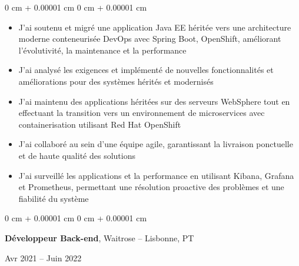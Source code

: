 \documentclass[10pt, letterpaper]{article}
\newenvironment{highlights}{
    \begin{itemize}[
        topsep=0.10 cm,
        parsep=0.10 cm,
        partopsep=0pt,
        itemsep=0pt,
        leftmargin=0 cm + 10pt
    ]
}{
    \end{itemize}
} %
\newenvironment{onecolentry}{
    \begin{adjustwidth}{
        0 cm + 0.00001 cm
    }{
        0 cm + 0.00001 cm
    }
}{
    \end{adjustwidth}
} %
\newenvironment{twocolentry}[2][]{
    \onecolentry
    \def\secondColumn{#2}
    \setcolumnwidth{\fill, 4.5 cm}
    \begin{paracol}{2}
}{
    \switchcolumn \raggedleft \secondColumn
    \end{paracol}
    \endonecolentry
} %
\begin{document}
        \begin{onecolentry}
            \begin{highlights}
                \item J'ai soutenu et migré une application Java EE héritée vers une architecture moderne conteneurisée DevOps avec Spring Boot, OpenShift, améliorant l'évolutivité, la maintenance et la performance
                \item J'ai analysé les exigences et implémenté de nouvelles fonctionnalités et améliorations pour des systèmes hérités et modernisés
                \item J'ai maintenu des applications héritées sur des serveurs WebSphere tout en effectuant la transition vers un environnement de microservices avec containerisation utilisant Red Hat OpenShift
                \item J'ai collaboré au sein d'une équipe agile, garantissant la livraison ponctuelle et de haute qualité des solutions
                \item J'ai surveillé les applications et la performance en utilisant Kibana, Grafana et Prometheus, permettant une résolution proactive des problèmes et une fiabilité du système
            \end{highlights}
        \end{onecolentry}
        
        \vspace{0.2 cm}

        \begin{twocolentry}{
            Avr 2021 – Juin 2022
        }
            \textbf{Développeur Back-end}, Waitrose -- Lisbonne, PT
        \end{twocolentry}

        \vspace{0.10 cm}
        
\end{document}
